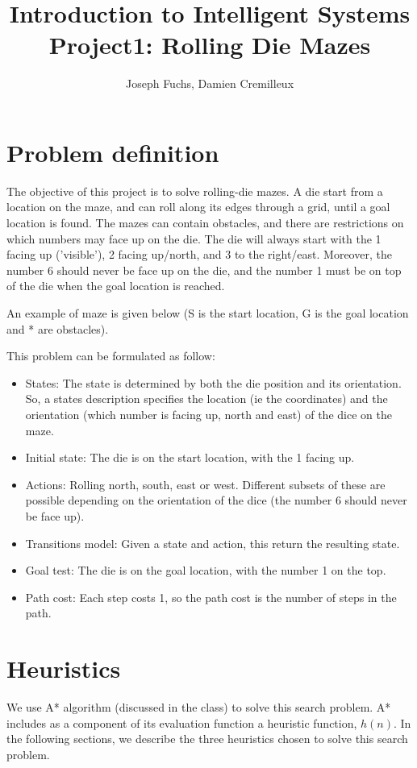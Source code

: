 \documentclass[]{article}
\title{Introduction to Intelligent Systems \\ Project1: Rolling Die Mazes}
\author{Joseph Fuchs, Damien Cremilleux}
\begin{document}
\maketitle

\section{Problem definition}
The objective of this project is to solve rolling-die mazes.
A  die start from a location on the maze, and can roll along its edges through a grid, until a goal location is found.
The mazes can contain obstacles, and there are restrictions on which numbers may face up on the die.
The die will always start with the 1 facing up ('visible'), 2 facing up/north, and 3 to the right/east.
Moreover, the number 6 should never be face up on the die, and the number 1 must be on top of the die when the goal location is reached.

\medskip

An example of maze is given below (S is the start location, G is the goal location and * are obstacles).



\medskip

This problem can be formulated as follow:
\begin{itemize}
\item States: The state is determined by both the die position and its orientation.
So, a states description specifies the location (ie the coordinates) and the orientation (which number is facing up, north and east) of the dice on the maze.
\item Initial state: The die is on the start location, with the 1 facing up.
\item Actions: Rolling north, south, east or west. Different subsets of these are possible depending on the orientation of the dice (the number 6 should never be face up).
\item Transitions model: Given a state and action, this return the resulting state.
\item Goal test: The die is on the goal location, with the number 1 on the top.
\item Path cost: Each step costs 1, so the path cost is the number of steps in the path.
\end{itemize}

\section{Heuristics}
We use A* algorithm (discussed in the class) to solve this search problem.
A* includes as a component of its evaluation function a heuristic function, $h(n)$.
In the following sections, we describe the three heuristics chosen to solve this search problem.
\end{document}
